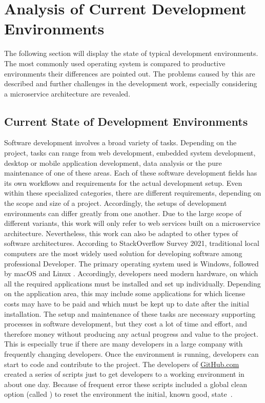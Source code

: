 
\section{Analysis of Current Development Environments}\label{sec::problem}
The following section will display the state of typical development environments. The most commonly used operating system is compared to productive environments their differences are pointed out. The problems caused by this are described and further challenges in the development work, especially considering a microservice architecture are revealed.

    \subsection{Current State of Development Environments}
    Software development involves a broad variety of tasks. Depending on the project, tasks can range from web development, embedded system development, desktop or mobile application development, data analysis or the pure maintenance of one of these areas. Each of these software development fields has its own workflows and requirements for the actual development setup. Even within these specialized categories, there are different requirements, depending on the scope and size of a project. Accordingly, the setups of development environments can differ greatly from one another. Due to the large scope of different variants, this work will only refer to web services built on a microservice architecture. Nevertheless, this work can also be adapted to other types of software architectures.\newline
    According to StackOverflow Survey 2021, traditional local computers are the most widely used solution for developing software among professional Developer. The primary operating system used is Windows, followed by macOS and Linux \cite{stackoverflow2021}. Accordingly, developers need modern hardware, on which all the required applications must be installed and set up individually. Depending on the application area, this may include some applications for which license costs may have to be paid and which must be kept up to date after the initial installation. The setup and maintenance of these tasks are necessary supporting processes in software development, but they cost a lot of time and effort, and therefore money without producing any actual progress and value to the project. This is especially true if there are many developers in a large company with frequently changing developers. Once the environment is running, developers can start to code and contribute to the project. The developers of \href{https://www.github.com}{GitHub.com} created a series of scripts just to get developers to a working environment in about one day. Because of frequent error these scripts included a global clean option (called ) to reset the environment the initial, known good, state~\cite{githubblogcodespace}.\newline
